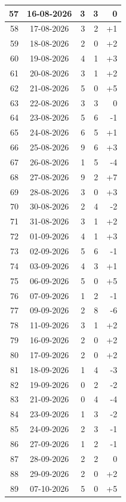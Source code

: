 \begin{longtable}{|r|c|r|r|r|}
57 & 16-08-2026 & 3 & 3 & 0 \\ \hline
58 & 17-08-2026 & 3 & 2 & +1 \\ \hline
59 & 18-08-2026 & 2 & 0 & +2 \\ \hline
60 & 19-08-2026 & 4 & 1 & +3 \\ \hline
61 & 20-08-2026 & 3 & 1 & +2 \\ \hline
62 & 21-08-2026 & 5 & 0 & +5 \\ \hline
63 & 22-08-2026 & 3 & 3 & 0 \\ \hline
64 & 23-08-2026 & 5 & 6 & -1 \\ \hline
65 & 24-08-2026 & 6 & 5 & +1 \\ \hline
66 & 25-08-2026 & 9 & 6 & +3 \\ \hline
67 & 26-08-2026 & 1 & 5 & -4 \\ \hline
68 & 27-08-2026 & 9 & 2 & +7 \\ \hline
69 & 28-08-2026 & 3 & 0 & +3 \\ \hline
70 & 30-08-2026 & 2 & 4 & -2 \\ \hline
71 & 31-08-2026 & 3 & 1 & +2 \\ \hline
72 & 01-09-2026 & 4 & 1 & +3 \\ \hline
73 & 02-09-2026 & 5 & 6 & -1 \\ \hline
74 & 03-09-2026 & 4 & 3 & +1 \\ \hline
75 & 06-09-2026 & 5 & 0 & +5 \\ \hline
76 & 07-09-2026 & 1 & 2 & -1 \\ \hline
77 & 09-09-2026 & 2 & 8 & -6 \\ \hline
78 & 11-09-2026 & 3 & 1 & +2 \\ \hline
79 & 16-09-2026 & 2 & 0 & +2 \\ \hline
80 & 17-09-2026 & 2 & 0 & +2 \\ \hline
81 & 18-09-2026 & 1 & 4 & -3 \\ \hline
82 & 19-09-2026 & 0 & 2 & -2 \\ \hline
83 & 21-09-2026 & 0 & 4 & -4 \\ \hline
84 & 23-09-2026 & 1 & 3 & -2 \\ \hline
85 & 24-09-2026 & 2 & 3 & -1 \\ \hline
86 & 27-09-2026 & 1 & 2 & -1 \\ \hline
87 & 28-09-2026 & 2 & 2 & 0 \\ \hline
88 & 29-09-2026 & 2 & 0 & +2 \\ \hline
89 & 07-10-2026 & 5 & 0 & +5 \\ \hline

\end{longtable}
